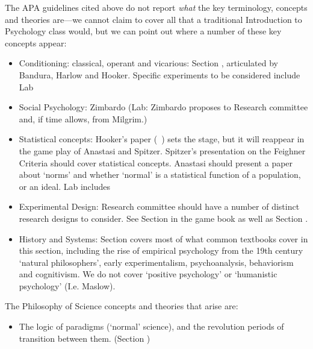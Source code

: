 \begin{refsection}
The APA guidelines cited above do not report \emph{what} the key terminology, concepts and theories are---we cannot claim to cover all that a traditional Introduction to Psychology class would, but we can point out where a number of these key concepts appear:

\begin{itemize}
\item Conditioning: classical, operant and vicarious: Section , articulated by Bandura, Harlow and Hooker. Specific experiments to be considered include Lab 

\item Social Psychology: Zimbardo (Lab: Zimbardo proposes  to Research committee and, if time allows,  from Milgrim.)

\item Statistical concepts: Hooker’s paper (~\citep{Psychology:tf}) sets the stage, but it will reappear in the game play of Anastasi and Spitzer. Spitzer’s presentation on the Feighner Criteria should cover statistical concepts. Anastasi should present a paper about ‘norms’ and whether ‘normal’ is a statistical function of a population, or an ideal. Lab includes 

\item Experimental Design: Research committee should have a number of distinct research designs to consider. See Section  in the game book as well as Section .

\item History and Systems: Section  covers most of what common textbooks cover in this section, including the rise of empirical psychology from the 19th century ‘natural philosophers’, early experimentalism, psychoanalysis, behaviorism and cognitivism. We do not cover ‘positive psychology’ or ‘humanistic psychology’ (I.e. Maslow).

\end{itemize}

The Philosophy of Science concepts and theories that arise are:

\begin{itemize}
\item The logic of paradigms (`normal' science), and the revolution periods of transition between them. (Section )


\end{itemize}
\end{refsection}
